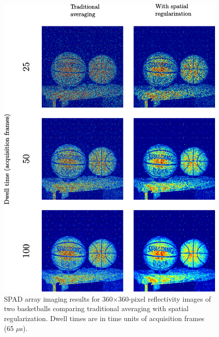 \begin{figure}[h!]
\centerline{\includegraphics[width=15cm]{figure-first-spad-bball-i.pdf}}
\caption{SPAD array imaging results for 360$\times$360-pixel reflectivity images of two basketballs comparing traditional averaging with spatial regularization. Dwell times are in time units of acquisition frames (65 $\mu$s).}
\label{figure:first-spad-bball-i}
\end{figure}

